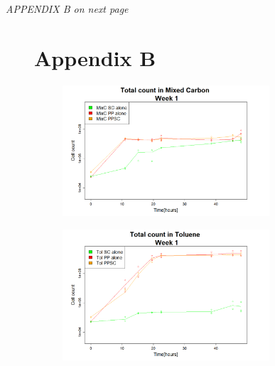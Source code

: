 \documentclass[a4paper, 10pt, conference]{ieeeconf}   %
\begin{document}
%
%

\vspace*{\fill}
\textit{APPENDIX B on next page}
\clearpage
{}
\begin{landscape}
	
	
	\begin{figure}
		\section*{Appendix B}
		
		\flushleft
		\begin{subfigure}{.47\textheight}
			\centering
			
			\includegraphics[width=7.71cm]{totcount_mixC1.png}
			\caption{}
			
			\label{totcountmixC1}
		\end{subfigure}%
		\begin{subfigure}{.47\textheight}
			\centering
			
			\includegraphics[width=7.71cm]{totcount_tol1.png}
			\caption{}
			\label{totcounttol1}
		\end{subfigure}%
		\begin{subfigure}{.47\textheight}
			\centering
			

\end{subfigure}
\end{figure}
\end{landscape}
\end{document}
